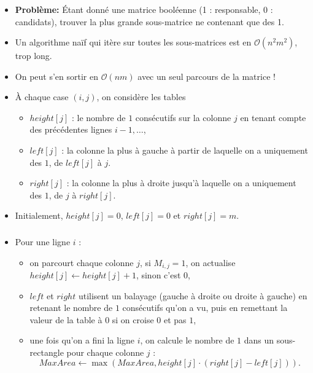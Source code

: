 \begin{frame}
    \frametitle{\problemtitle}
    \begin{itemize}
        \item<+-> \textbf{Problème:} Étant donné une matrice booléenne (1 : responsable, 0 : candidats), trouver la plus grande sous-matrice ne contenant que des 1.
        \item<+-> Un algorithme naïf qui itère sur toutes les sous-matrices est en $\mathcal{O}(n^2m^2)$, trop long.
        \item<+-> On peut s'en sortir en $\mathcal{O}(nm)$ avec un seul parcours de la matrice !
        \item<+-> À chaque case $(i,j)$, on considère les tables
                  \begin{itemize}
                     \item $height[j]$ : le nombre de $1$ consécutifs sur la colonne $j$ en tenant compte des précédentes lignes $i-1,\dots$,
                     \item $left[j]$ : la colonne la plus à gauche à partir de laquelle on a uniquement des $1$, de $left[j]$ à $j$.
                     \item $right[j]$ : la colonne la plus à droite jusqu'à laquelle on a uniquement des $1$, de $j$ à $right[j]$.
                  \end{itemize}
        \item<+-> Initialement, $height[j]=0$, $left[j]=0$ et $right[j]=m$.
    \end{itemize}
\end{frame}

\begin{frame}
    \frametitle{\problemtitle}
    \begin{itemize}
        \item<+-> Pour une ligne $i$ :
                  \begin{itemize}
                     \item on parcourt chaque colonne $j$, si $M_{i,j}=1$, on actualise $height[j]\leftarrow height[j]+1$, sinon c'est $0$,
                     \item $left$ et $right$ utilisent un balayage (gauche à droite ou droite à gauche) en retenant le nombre de $1$ consécutifs qu'on a vu, puis en remettant la valeur de la table à $0$ si on croise $0$ et pas $1$,
                     \item<+-> une fois qu'on a fini la ligne $i$, on calcule le nombre de $1$ dans un sous-rectangle pour chaque colonne $j$ : \[MaxArea \leftarrow \max(MaxArea, height[j]\cdot (right[j]-left[j])).\]
                  \end{itemize}
    \end{itemize}
\end{frame}